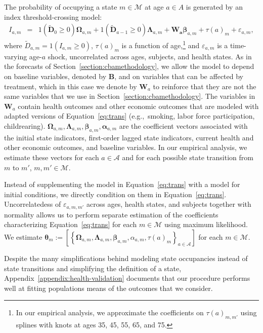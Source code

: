 The probability of occupying a state $m \in \mathcal{M}$ at age $a \in{A}$ is generated by an index threshold-crossing model:
\begin{eqnarray}
I_{a,m} &=&  \bm{\mathit{1}} \left( \tilde{\bm{D}}_{0} \geq 0 \right) \bm{\Omega}_{a,m} + \bm{\mathit{1}} \left( \tilde{\bm{D}}_{a-1} \geq 0\right) \bm{\Lambda}_{a,m} + \bm{W_a} \bm{\beta}_{a,m} + \tau \left( a \right)_{m} + \varepsilon_{a,m}, \label{eq:trans}
\end{eqnarray}
where $\tilde{D}_{a,m} = \bm{\mathit{1}}  \left( I_{a,m} \geq 0 \right)$, $\tau \left( a \right)_{m}$ is a function of age,\footnote{In our empirical analysis, we approximate the coefficients on $\tau \left( a \right)_{m,m'}$ using splines with knots at ages 35, 45, 55, 65, and 75.} and $\varepsilon_{a,m}$ is a time-varying age-$a$ shock, uncorrelated across ages, subjects, and health states. As in the forecasts of Section~\ref{section:cbamethodology}, we allow the model to depend on baseline variables, denoted by $\bm{B}$, and on variables that can be affected by treatment, which in this case we denote by $\bm{W}_a$ to reinforce that they are not the same variables that we use in Section~\ref{section:cbamethodology}. The variables in $\bm{W}_a$ contain health outcomes and other economic outcomes that are modeled with adapted versions of Equation~\eqref{eq:trans} (e.g.,\ smoking, labor force participation, childrearing). $ \bm{\Omega}_{a,m},  \bm{\Lambda}_{a,m}, \bm{\beta}_{a,m},  \bm{\alpha}_{a,m}$ are the coefficient vectors associated with the initial state indicators, first-order lagged state indicators, current health and other economic outcomes, and baseline variables. In our empirical analysis, we estimate these vectors for each $a \in \mathcal{A}$ and for each possible state transition from $m$ to $m'$, $m,m' \in \mathcal{M}$.

Instead of supplementing the model in Equation~\eqref{eq:trans} with a model for initial conditions, we directly condition on them in Equation~\eqref{eq:trans}. Uncorrelatedess of $\varepsilon_{a,m,m'}$ across ages, health states, and subjects together with normality allows us to perform separate estimation of the coefficients characterizing Equation~\eqref{eq:trans} for each $m \in \mathcal{M}$ using maximum likelihood. We estimate $\bm{\theta}_m := \left[ \left\{  \bm{\Omega}_{a,m}, \bm{\Lambda}_{a,m}, \bm{\beta}_{a,m}, \alpha_{a,m}, \tau \left( a \right) _{m}  \right\}_{a \in \mathcal{A}} \right]$ for each $m \in \mathcal{M}$.

Despite the many simplifications behind modeling state occupancies instead of state transitions and simplifying the definition of a state, Appendix~\ref{appendix:health-validation} documents that our procedure performs well at fitting populations means of the outcomes that we consider.

